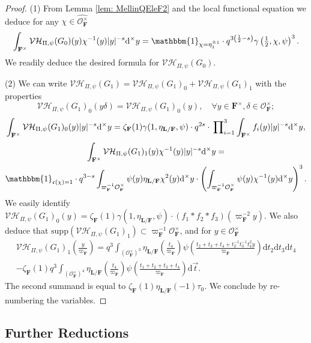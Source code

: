 \documentclass[A4]{amsart}
\numberwithin{equation}{section} \everymath{\displaystyle}
\newcommand{\id}{\mathbbm{1}}
\newcommand{\ud}{\mathrm{d}}
\newcommand{\F}{\mathbf{F}}
\newcommand{\bL}{\mathbf{L}}
\newcommand{\vO}{\mathcal{O}}
\newcommand{\norm}[1][\cdot]{\lvert #1 \rvert}
\newcommand{\VorH}{\mathcal{VH}}
\newcommand{\cond}{\mathfrak{c}}
\begin{document}
\begin{proof}
	(1) From Lemma \ref{lem: MellinQEleF2} and the local functional equation we deduce for any $\chi \in \widehat{\vO_{\F}^{\times}}$
	$$ \int_{\F^{\times}} \VorH_{\Pi,\psi}(G_0)(y) \chi^{-1}(y) \norm[y]^{-s} \ud^{\times} y = \id_{\chi = \eta_1^{\pm 1}} \cdot q^{3 \left( \frac{1}{2}-s \right)} \gamma \left( \tfrac{1}{2},\chi,\psi \right)^3. $$
	We readily deduce the desired formula for $\VorH_{\Pi,\psi}(G_0)$.
	
\noindent (2) We can write $\VorH_{\Pi,\psi}(G_1) = \VorH_{\Pi,\psi}(G_1)_0 + \VorH_{\Pi,\psi}(G_1)_1$ with the properties
	$$ \VorH_{\Pi,\psi}(G_1)_0(y\delta) = \VorH_{\Pi,\psi}(G_1)_0(y), \quad \forall y \in \F^{\times}, \delta \in \vO_{\F}^{\times}; $$
	$$ \int_{\F^{\times}} \VorH_{\Pi,\psi}(G_1)_0(y) \norm[y]^{-s} \ud^{\times} y = \zeta_{\F}(1) \gamma(1,\eta_{\bL/\F},\psi) \cdot q^{2s} \cdot \sideset{}{_{i=1}^3} \prod \int_{\F^{\times}} f_i(y) \norm[y]^{-s} \ud^{\times} y, $$
\begin{multline*} 
	\int_{\F^{\times}} \VorH_{\Pi,\psi}(G_1)_1(y) \chi^{-1}(y) \norm[y]^{-s} \ud^{\times} y = \\
	\id_{\cond(\chi)=1} \cdot q^{3-s} \int_{\varpi_{\F}^{-1}\vO_{\F}^{\times}} \psi(y) \eta_{\bL/\F}\chi^2(y) \ud^{\times} y \cdot \left( \int_{\varpi_{\F}^{-1} \vO_{\F}^{\times}} \psi(y) \chi^{-1}(y) \ud^{\times}y \right)^3.
\end{multline*}
	We easily identify $\VorH_{\Pi,\psi}(G_1)_0(y) = \zeta_{\F}(1) \gamma(1,\eta_{\bL/\F},\psi) \cdot \left( f_1*f_2*f_3 \right)(\varpi_{\F}^{-2}y)$. We also deduce that $\mathrm{supp}(\VorH_{\Pi,\psi}(G_1)_1) \subset \varpi_{\F}^{-1} \vO_{\F}^{\times}$, and for $y \in \vO_{\F}^{\times}$
\begin{multline*}
	\VorH_{\Pi,\psi}(G_1)_1 \left( \tfrac{y}{\varpi_{\F}} \right) = q^{3} \int_{(\vO_{\F}^{\times})^3} \eta_{\bL/\F} \left( \tfrac{t_4}{\varpi_{\F}} \right) \psi \left( \tfrac{t_2+t_3+t_4 + t_2^{-1}t_3^{-1}t_4^2y}{\varpi_{\F}} \right) \ud t_2 \ud t_3 \ud t_4 \\
	- \zeta_{\F}(1) q^{3} \int_{(\vO_{\F}^{\times})^4} \eta_{\bL/\F} \left( \tfrac{t_4}{\varpi_{\F}} \right) \psi \left( \tfrac{t_1+t_2+t_3+t_4}{\varpi_{\F}} \right) \ud \vec{t}.
\end{multline*}
	The second summand is equal to $\zeta_{\F}(1) \eta_{\bL/\F}(-1) \tau_0$. We conclude by re-numbering the variables.
\end{proof}
	
	
	\subsection{Further Reductions}
	
\end{document}
